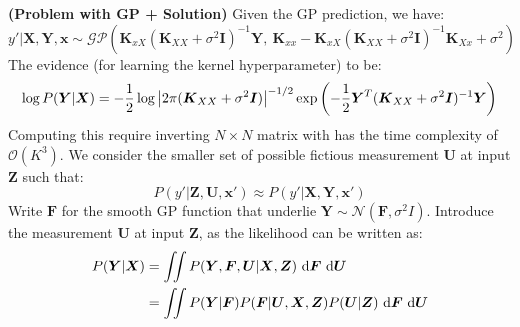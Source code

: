 \begin{remark}{\textbf{(Problem with GP + Solution)}}
    Given the GP prediction, we have:
    \begin{equation*}
        y' | \boldsymbol X, \boldsymbol Y, \boldsymbol x \sim \mathcal{GP}( \boldsymbol K_{xX}(\boldsymbol K_{XX} + \sigma^2\boldsymbol I)^{-1} \boldsymbol Y, \ \boldsymbol K_{xx} - \boldsymbol K_{xX}(\boldsymbol K_{XX} + \sigma^2\boldsymbol I)^{-1}\boldsymbol K_{Xx} + \sigma^2 )
    \end{equation*} 
    The evidence (for learning the kernel hyperparameter) to be:
    \begin{equation*}
        \log P(\boldsymbol Y | \boldsymbol X) = -\frac{1}{2}\log\left| 2\pi(\boldsymbol K_{XX} + \sigma^2\boldsymbol I) \right|^{-1/2} \exp\left( -\frac{1}{2} \boldsymbol Y^T(\boldsymbol K_{XX} + \sigma^2\boldsymbol I)^{-1}\boldsymbol Y  \right)
    \end{equation*}
    Computing this require inverting $N\times N$ matrix with has the time complexity of $\mathcal{O}(K^3)$. We consider the smaller set of possible fictious measurement $\boldsymbol U$ at input $\boldsymbol Z$ such that:
    \begin{equation*}
        P(y' | \boldsymbol Z, \boldsymbol U, \boldsymbol x') \approx P(y' | \boldsymbol X, \boldsymbol Y, \boldsymbol x')
    \end{equation*}
    Write $\boldsymbol F$ for the smooth GP function that underlie $\boldsymbol Y\sim\mathcal{N}(\boldsymbol F, \sigma^2I)$. Introduce the measurement $\boldsymbol U$ at input $\boldsymbol Z$, as the likelihood can be written as:
    \begin{equation*}
    \begin{aligned}
        P(\boldsymbol Y | \boldsymbol X) &= \iint P(\boldsymbol Y, \boldsymbol F, \boldsymbol U | \boldsymbol X, \boldsymbol Z) \ \mathrm{d} \boldsymbol F\ \mathrm{d} \boldsymbol U \\
        &= \iint P(\boldsymbol Y|\boldsymbol F)P(\boldsymbol F | \boldsymbol U, \boldsymbol X, \boldsymbol Z)P(\boldsymbol U | \boldsymbol Z)\ \mathrm{d} \boldsymbol F\ \mathrm{d} \boldsymbol U
    \end{aligned}
    \end{equation*}
\end{remark}

